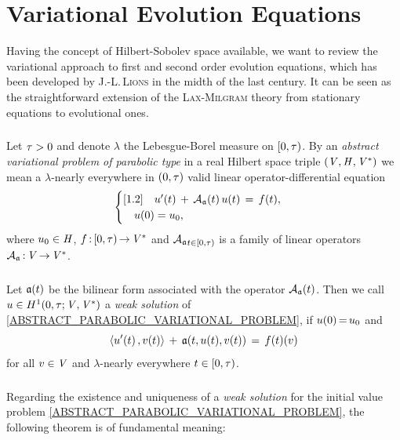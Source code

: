 \documentclass[11pt,twoside]{article}
\begin{document}
\section{Variational Evolution Equations}                                      %
Having the concept of Hilbert-Sobolev space available,
we want to review the variational approach to first and second order
evolution equations,
which has been developed by \textsc{J.-L.\,Lions}
in the midth of the last century.
It can be seen as the straightforward extension of
the \textsc{Lax-Milgram} theory from stationary equations to evolutional ones.

\subparagraph*{}
Let $\tau > 0$ and denote $\lambda$ the Lebesgue-Borel measure on $[0,\tau)$.
By an \textit{abstract variational problem of parabolic type}
in a real Hilbert space triple $(\mathit{V},\mathit{H},\mathit{V}^*)$
we mean a $\lambda$-nearly everywhere in $(0,\tau)$ valid
linear operator-differential equation
\begin{equation}\label{ABSTRACT_PARABOLIC_VARIATIONAL_PROBLEM}
\begin{cases}[1.2]
\quad u'(t) \, + \, {{\mathcal{A}}_{\mathfrak{a}}}(t) \, u(t) \,=\, f(t), \\
\quad u(0) = u_0, \\
\end{cases}
\end{equation}
where $u_0 \in \mathit{H}$,
$f{\,:\,}[0,\tau) {\,\to\,} \mathit{V}^*$
and ${{\mathcal{A}}_{\mathfrak{a}}}_{t \in [0,\tau)}$ is a family
of linear operators ${{\mathcal{A}}_{\mathfrak{a}}}{\,:\,}\mathit{V} {\,\to\,} \mathit{V}^*$.

\subparagraph*{} %
Let $\mathfrak{a}(t)$ be the bilinear form associated with the operator ${{\mathcal{A}}_{\mathfrak{a}}}(t)$.
Then we call $u \in H^1(0,\tau;\mathit{V},\mathit{V}^*)$
a \textit{weak solution} of \eqref{ABSTRACT_PARABOLIC_VARIATIONAL_PROBLEM},
if $u(0) {\,=\,} u_0$ and
\[
\langle u'(t)\,,v(t) \rangle \, + \, \mathfrak{a}(t,u(t),v(t)) \,=\, f(t)(v)
\]
for all $v \in \mathit{V}$ and $\lambda$-nearly everywhere $t \in [0,\tau)$.

\subparagraph*{} %
Regarding the existence and uniqueness of a \textit{weak solution}
for the initial value problem \eqref{ABSTRACT_PARABOLIC_VARIATIONAL_PROBLEM},
the following theorem is of fundamental meaning:
\end{document}
